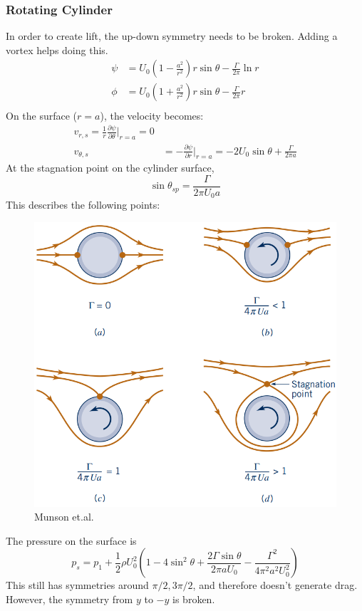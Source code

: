 \subsubsection{Rotating Cylinder}
In order to create lift, the up-down symmetry needs to be broken. Adding a vortex helps doing this.
\begin{equation*}
	\begin{split}
		\psi &= U_0\left(1-\frac{a^2}{r^2}\right)r\sin\theta - \frac \Gamma {2\pi}\ln r\\
		\phi &= U_0\left(1+\frac{a^2}{r^2}\right)r\sin\theta - \frac \Gamma {2\pi} r\\
	\end{split}
\end{equation*}
On the surface ($r=a$), the velocity becomes:
\begin{equation*}
	\begin{split}
		v_{r,s} = \frac{1}{r}\frac{\partial \psi}{\partial \theta}\Big|_{r=a} = 0\\
		v_{\theta,s} &= -\frac{\partial \psi}{\partial r} \Big|_{r=a} = -2U_0 \sin\theta + \frac{\Gamma}{2\pi a}
	\end{split}
\end{equation*}
At the stagnation point on the cylinder surface, 
\begin{equation*}
	\sin\theta_{sp} = \frac{\Gamma}{2\pi U_0 a}
\end{equation*}
This describes the following points:
\begin{figure}[H]
	\centering
	\includegraphics[width=0.4\linewidth]{Sketches/rotating_cylinder_stagnation_points}
	\caption{Munson et.al.}
	\label{fig:rotatingcylinderstagnationpoints}
\end{figure}
The pressure on the surface is
\begin{equation*}
	p_s = p_1 + \frac 12 \rho U_0^2 \left(1-4\sin^2\theta + \frac{2\Gamma\sin\theta}{2\pi a U_0}-\frac{\Gamma^2}{4\pi^2 a^2 U_0^2}\right)
\end{equation*}
This still has symmetries around $\pi/2, 3\pi/2$, and therefore doesn't generate drag. However, the symmetry from $y$ to $-y$ is broken.
